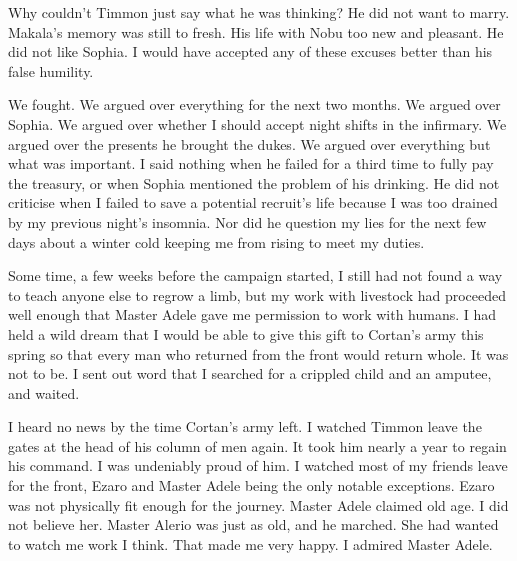 \documentclass{article}
\begin{document}
Why couldn't Timmon just say what he was thinking? He did not want to marry. Makala's memory was still to fresh. His life with Nobu too new and pleasant. He did not like Sophia. I would have accepted any of these excuses better than his false humility. 

We fought. We argued over everything for the next two months. We argued over Sophia. We argued over whether I should accept night shifts in the infirmary. We argued over the presents he brought the dukes. We argued over everything but what was important. I said nothing when he failed for a third time to fully pay the treasury, or when Sophia mentioned the problem of his drinking. He did not criticise when I failed to save a potential recruit's life because I was too drained by my previous night's insomnia. Nor did he question my lies for the next few days about a winter cold keeping me from rising to meet my duties.

Some time, a few weeks before the campaign started, I still had not found a way to teach anyone else to regrow a limb, but my work with livestock had proceeded well enough that Master Adele gave me permission to work with humans. I had held a wild dream that I would be able to give this gift to Cortan's army this spring so that every man who returned from the front would return whole. It was not to be. I sent out word that I searched for a crippled child and an amputee, and waited. 

I heard no news by the time Cortan's army left. I watched Timmon leave the gates at the head of his column of men again. It took him nearly a year to regain his command. I was undeniably proud of him. I watched most of my friends leave for the front, Ezaro and Master Adele being the only notable exceptions. Ezaro was not physically fit enough for the journey. Master Adele claimed old age. I did not believe her. Master Alerio was just as old, and he marched. She had wanted to watch me work I think. That made me very happy. I admired Master Adele. 
\end{document}
